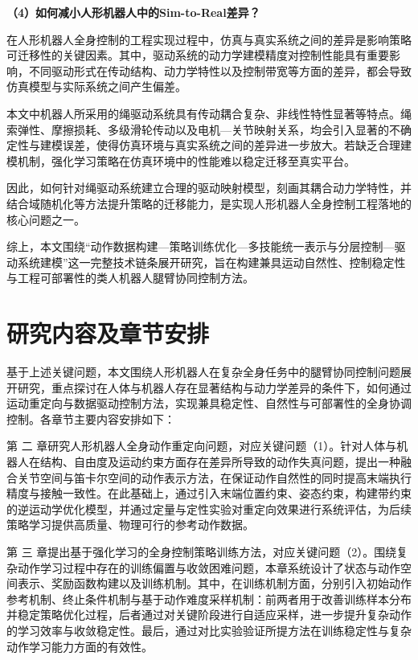 \textbf{（4）如何减小人形机器人中的Sim-to-Real差异？}

在人形机器人全身控制的工程实现过程中，仿真与真实系统之间的差异是影响策略可迁移性的关键因素。其中，驱动系统的动力学建模精度对控制性能具有重要影响，不同驱动形式在传动结构、动力学特性以及控制带宽等方面的差异，都会导致仿真模型与实际系统之间产生偏差。

本文中机器人所采用的绳驱动系统具有传动耦合复杂、非线性特性显著等特点。绳索弹性、摩擦损耗、多级滑轮传动以及电机—关节映射关系，均会引入显著的不确定性与建模误差，使得仿真环境与真实系统之间的差异进一步放大。若缺乏合理建模机制，强化学习策略在仿真环境中的性能难以稳定迁移至真实平台。

因此，如何针对绳驱动系统建立合理的驱动映射模型，刻画其耦合动力学特性，并结合域随机化等方法提升策略的迁移能力，是实现人形机器人全身控制工程落地的核心问题之一。


综上，本文围绕“动作数据构建—策略训练优化—多技能统一表示与分层控制—驱动系统建模”这一完整技术链条展开研究，旨在构建兼具运动自然性、控制稳定性与工程可部署性的类人机器人腿臂协同控制方法。

\section{研究内容及章节安排}

基于上述关键问题，本文围绕人形机器人在复杂全身任务中的腿臂协同控制问题展开研究，重点探讨在人体与机器人存在显著结构与动力学差异的条件下，如何通过运动重定向与数据驱动控制方法，实现兼具稳定性、自然性与可部署性的全身协调控制。各章节主要内容安排如下：


第 二 章研究人形机器人全身动作重定向问题，对应关键问题（1）。针对人体与机器人在结构、自由度及运动约束方面存在差异所导致的动作失真问题，提出一种融合关节空间与笛卡尔空间的动作表示方法，在保证动作自然性的同时提高末端执行精度与接触一致性。在此基础上，通过引入末端位置约束、姿态约束，构建带约束的逆运动学优化模型，并通过定量与定性实验对重定向效果进行系统评估，为后续策略学习提供高质量、物理可行的参考动作数据。


第 三 章提出基于强化学习的全身控制策略训练方法，对应关键问题（2）。围绕复杂动作学习过程中存在的训练偏置与收敛困难问题，本章系统设计了状态与动作空间表示、奖励函数构建以及训练机制。其中，在训练机制方面，分别引入初始动作参考机制、终止条件机制与基于动作难度采样机制：前两者用于改善训练样本分布并稳定策略优化过程，后者通过对关键阶段进行自适应采样，进一步提升复杂动作的学习效率与收敛稳定性。最后，通过对比实验验证所提方法在训练稳定性与复杂动作学习能力方面的有效性。



